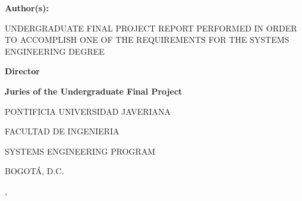 \thispagestyle{fancy}

\begin{center}
    {\large\bfseries \proyectoCodigo\par}
    \vspace{0.5cm}
    {\large\bfseries \proyectoTitulo\par}
\end{center}

\vspace{3cm}

\begin{center}
    {\large\bfseries Author(s):\par}
    \vspace{0.5cm}
    {\large \autorUno\par}
    {\large \autorDos\par}
\end{center}

\vspace{3cm}

\begin{center}
    UNDERGRADUATE FINAL PROJECT REPORT PERFORMED IN ORDER TO ACCOMPLISH ONE OF THE REQUIREMENTS FOR THE SYSTEMS ENGINEERING DEGREE
\end{center}

\vspace{2cm}

\begin{center}
    {\large\bfseries Director\par}
    \vspace{0.5cm}
    {\large \director\par}

    \vspace{1.5cm}

    {\large\bfseries Juries of the Undergraduate Final Project\par}
    \vspace{0.5cm}
    {\large \juradoUno\par}
    {\large \juradoDos\par}
\end{center}

\vfill

\begin{center}
    {\large PONTIFICIA UNIVERSIDAD JAVERIANA\par}
    {\large FACULTAD DE INGENIERIA\par}
    {\large SYSTEMS ENGINEERING PROGRAM\par}
    {\large BOGOTÁ, D.C.\par}
    {\large \mes, \anio\par}
\end{center}
